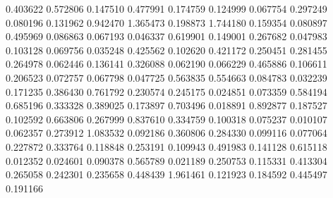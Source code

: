 0.403622
0.572806
0.147510
0.477991
0.174759
0.124999
0.067754
0.297249
0.080196
0.131962
0.942470
1.365473
0.198873
1.744180
0.159354
0.080897
0.495969
0.086863
0.067193
0.046337
0.619901
0.149001
0.267682
0.047983
0.103128
0.069756
0.035248
0.425562
0.102620
0.421172
0.250451
0.281455
0.264978
0.062446
0.136141
0.326088
0.062190
0.066229
0.465886
0.106611
0.206523
0.072757
0.067798
0.047725
0.563835
0.554663
0.084783
0.032239
0.171235
0.386430
0.761792
0.230574
0.245175
0.024851
0.073359
0.584194
0.685196
0.333328
0.389025
0.173897
0.703496
0.018891
0.892877
0.187527
0.102592
0.663806
0.267999
0.837610
0.334759
0.100318
0.075237
0.010107
0.062357
0.273912
1.083532
0.092186
0.360806
0.284330
0.099116
0.077064
0.227872
0.333764
0.118848
0.253191
0.109943
0.491983
0.141128
0.615118
0.012352
0.024601
0.090378
0.565789
0.021189
0.250753
0.115331
0.413304
0.265058
0.242301
0.235658
0.448439
1.961461
0.121923
0.184592
0.445497
0.191166
